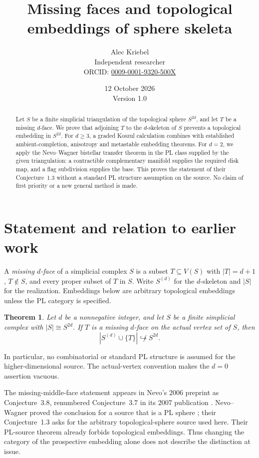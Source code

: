 \documentclass[11pt]{article}
\title{Missing faces and topological embeddings of sphere skeleta}
\author{Alec Kriebel\\
\small Independent researcher\\
\small ORCID: \href{https://orcid.org/0009-0001-9320-500X}{0009-0001-9320-500X}}
\date{12 October 2026\\\small Version 1.0}
\newtheorem{theorem}{Theorem}
\theoremstyle{remark}
\begin{document}
\maketitle

\begin{abstract}
Let $S$ be a finite simplicial triangulation of the topological sphere
$S^{2d}$, and let $T$ be a missing $d$-face. We prove that adjoining $T$ to
the $d$-skeleton of $S$ prevents a topological embedding in $S^{2d}$.
For $d\geq3$, a graded Koszul calculation combines with established
ambient-completion, anisotropy and metastable embedding theorems. For
$d=2$, we apply the Nevo--Wagner bistellar transfer theorem in the PL
class supplied by the given triangulation: a contractible complementary
manifold supplies the required disk map, and a flag subdivision supplies
the base. This proves the statement of their Conjecture~1.3 without a
standard PL structure assumption on the source. No claim of first priority
or a new general method is made.
\end{abstract}

\section{Statement and relation to earlier work}

A \emph{missing $d$-face} of a simplicial complex $S$ is a subset
$T\subseteq V(S)$ with $|T|=d+1$, $T\notin S$, and every proper subset of
$T$ in $S$. Write $S^{(d)}$ for the $d$-skeleton and $|S|$ for the
realization. Embeddings below are arbitrary topological embeddings unless
the PL category is specified.

\begin{theorem}\label{thm:main}
Let $d$ be a nonnegative integer, and let $S$ be a finite simplicial complex with
$|S|\cong S^{2d}$. If $T$ is a missing $d$-face on the actual vertex set of
$S$, then
\[
                 |S^{(d)}\cup\{T\}|\not\hookrightarrow S^{2d}.
\]
\end{theorem}

In particular, no combinatorial or standard PL structure is assumed for
the higher-dimensional source. The actual-vertex convention makes the
$d=0$ assertion vacuous.

The missing-middle-face statement appears in Nevo's 2006 preprint as
Conjecture~3.8, renumbered Conjecture~3.7 in its 2007 publication
\cite{N}. Nevo--Wagner proved the conclusion for a source that is a PL
sphere \cite[Theorem~1.2]{NW}; their Conjecture~1.3 asks for the arbitrary
topological-sphere source used here. Their PL-source theorem already
forbids topological embeddings. Thus changing the category of the
prospective embedding alone does not describe the distinction at issue.
\end{document}
